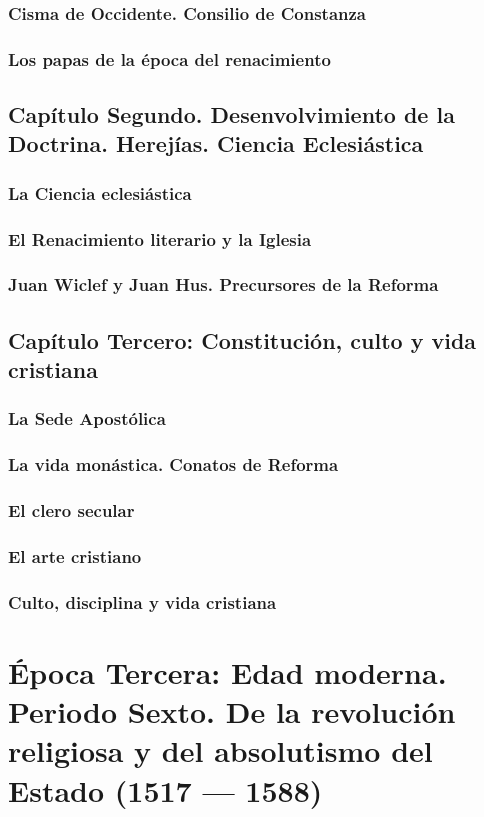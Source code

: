 \raggedbottom{} \documentclass[12pt, a4paper]{book}
\begin{document}
\section{Cisma de Occidente. Consilio de Constanza}
\section{Los papas de la época del renacimiento}
\chapter{Capítulo Segundo. Desenvolvimiento de la Doctrina. Herejías. Ciencia Eclesiástica}
\section{La Ciencia eclesiástica}
\section{El Renacimiento literario y la Iglesia}
\section{Juan Wiclef y Juan Hus. Precursores de la Reforma}
\chapter{Capítulo Tercero: Constitución, culto y vida cristiana}
\section{La Sede Apostólica}
\section{La vida monástica. Conatos de Reforma}
\section{El clero secular}
\section{El arte cristiano}
\section{Culto, disciplina y vida cristiana}
\part{Época Tercera: Edad moderna. Periodo Sexto. De la revolución religiosa y del absolutismo del Estado (1517 --- 1588)}
\end{document}
